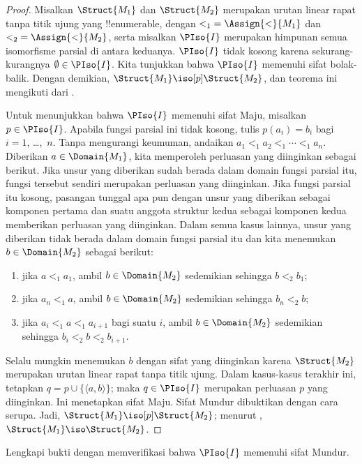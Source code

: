 \documentclass[../../../include/open-logic-section]{subfiles}
\begin{document}
\begin{proof}
  Misalkan $\Struct{M_1}$ dan $\Struct{M_2}$ merupakan urutan linear rapat
  tanpa titik ujung yang !!{enumerable}, dengan ${<_1} = \Assign{<}{M_1}$
  dan ${<_2} = \Assign{<}{M_2}$, serta misalkan $\PIso{I}$ merupakan
  himpunan semua isomorfisme parsial di antara keduanya. $\PIso{I}$ tidak
  kosong karena sekurang-kurangnya $\emptyset \in \PIso{I}$. Kita tunjukkan
  bahwa $\PIso{I}$ memenuhi sifat bolak-balik. Dengan demikian,
  $\Struct{M_1} \iso[p] \Struct{M_2}$, dan teorema ini mengikuti dari
  .

  Untuk menunjukkan bahwa $\PIso{I}$ memenuhi sifat Maju, misalkan
  $p \in \PIso{I}$. Apabila fungsi parsial ini tidak kosong, tulis
  $p(a_i) = b_i$ bagi $i = 1$, \dots,~$n$. Tanpa mengurangi keumuman,
  andaikan $a_1 <_1 a_2 <_1 \cdots <_1 a_n$.
  Diberikan $a \in \Domain{M_1}$, kita memperoleh perluasan yang diinginkan
  sebagai berikut. Jika unsur yang diberikan sudah berada dalam domain
  fungsi parsial itu, fungsi tersebut sendiri merupakan perluasan yang
  diinginkan. Jika fungsi parsial itu kosong, pasangan tunggal apa pun dengan
  unsur yang diberikan sebagai komponen pertama dan suatu anggota struktur
  kedua sebagai komponen kedua memberikan perluasan yang diinginkan. Dalam
  semua kasus lainnya, unsur yang diberikan tidak berada dalam domain fungsi
  parsial itu dan kita menemukan $b \in \Domain{M_2}$ sebagai berikut:
  \begin{enumerate}
  \item jika $a <_1 a_1$, ambil $b \in \Domain{M_2}$ sedemikian sehingga
    $b <_2 b_1$;
  \item jika $a_n <_1 a$, ambil $b \in \Domain{M_2}$ sedemikian sehingga
    $b_n <_2 b$;
  \item jika $a_i <_1 a <_1 a_{i+1}$ bagi suatu $i$, ambil
    $b \in \Domain{M_2}$ sedemikian sehingga $b_i <_2 b <_2 b_{i+1}$.
  \end{enumerate}
  Selalu mungkin menemukan $b$ dengan sifat yang diinginkan karena
  $\Struct{M_2}$ merupakan urutan linear rapat tanpa titik ujung. Dalam
  kasus-kasus terakhir ini, tetapkan $q = p \cup \{ \langle a, b \rangle
  \}$; maka $q \in \PIso{I}$ merupakan perluasan $p$ yang diinginkan. Ini
  menetapkan sifat Maju. Sifat Mundur dibuktikan dengan cara serupa. Jadi,
  $\Struct{M_1} \iso[p] \Struct{M_2}$; menurut
  , $\Struct{M_1} \iso \Struct{M_2}$.
\end{proof}

\begin{prob}
  Lengkapi bukti  dengan memverifikasi
  bahwa $\PIso{I}$ memenuhi sifat Mundur.
\end{prob}
\end{document}
